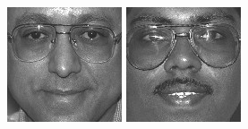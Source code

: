 \begin{figure}[ht]
\begin{center}
  \includegraphics[width=\columnwidth/10]{ch5/figures/feret7.jpg}
  \includegraphics[width=\columnwidth/10]{ch5/figures/feret8.jpg}

\end{center}
\end{figure}
